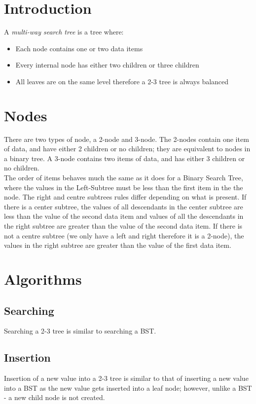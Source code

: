 
\section{Introduction}
A \textit{multi-way search tree} is a tree where:
\begin{itemize}
    \item Each node contains one or two data items
    \item Every internal node has either two children or three children
    \item All leaves are on the same level therefore a 2-3 tree is always balanced
\end{itemize}

\section{Nodes}
There are two types of node, a 2-node and 3-node. The 2-nodes contain one item of data, and have either 2 children or no children; they are equivalent to nodes in a binary tree. A 3-node contains two items of data, and has either 3 children or no children.\\

The order of items behaves much the same as it does for a Binary Search Tree, where the values in the Left-Subtree must be less than the first item in the the node. The right and centre subtrees rules differ depending on what is present. If there is a center subtree, the values of all descendants in the center subtree are less than the value of the second data item and values of all the descendants in the right subtree are greater than the value of the second data item. If there is not a centre subtree (we only have a left and right therefore it is a 2-node), the values in the right subtree are greater than the value of the first data item.


\section{Algorithms}
\subsection{Searching}
Searching a 2-3 tree is similar to searching a BST.

\subsection{Insertion}
Insertion of a new value into a 2-3 tree is similar to that of inserting a new value into a BST as the new value gets inserted into a leaf node; however, unlike a BST - a new child node is not created.\\

